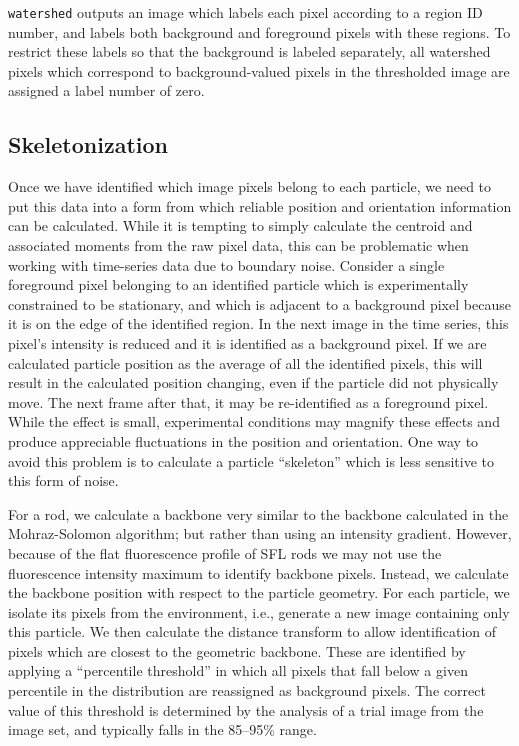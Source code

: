 \texttt{watershed} outputs an image which labels each pixel according to a region ID number, and labels both background
and foreground pixels with these regions. To restrict these labels so that the background is labeled separately, all 
watershed pixels which correspond to background-valued pixels in the thresholded image are assigned a label number of zero.

\subsection{Skeletonization}

Once we have identified which image pixels belong to each particle, we need to put this data into a form from
which reliable position and orientation information can be calculated.  While it is tempting to simply
calculate the centroid and associated moments from the raw pixel data, this can be problematic when working with
time-series data due to boundary noise. Consider a single foreground pixel belonging to 
an identified particle which is experimentally
constrained to be stationary, and which is adjacent to a background pixel because it is on the edge of the identified 
region. In the next image in the time series, this pixel's intensity is reduced and it is identified as a background
pixel.  If we are calculated particle position as the average of all the identified pixels, this will result in 
the calculated position changing, even if the particle did not physically move. The next frame after that, it 
may be re-identified as a foreground pixel.  While the effect is small, experimental conditions may magnify
these effects and produce appreciable fluctuations in the position and orientation. One way to 
avoid this problem
is to calculate a particle ``skeleton'' which is less sensitive to this form of noise.~\cite{soille-book}

For a rod, we calculate a backbone very similar to the backbone calculated in the Mohraz-Solomon algorithm; but rather 
than using an intensity gradient. However, because of the flat fluorescence profile of SFL rods
we may not use the fluorescence intensity maximum to identify backbone pixels. Instead, we calculate 
the backbone position with respect to the particle geometry. For each particle, we 
isolate its pixels from the environment, i.e., generate a new image containing only this particle. We then
calculate the distance transform to allow identification of pixels which are closest to the 
geometric backbone.  These are identified by applying a ``percentile threshold'' in which all pixels that
fall below a given percentile in the distribution are reassigned as background pixels. 
The correct value of this threshold is determined by the analysis of a trial image from the image set,
and typically falls in the 85--95\% range.


